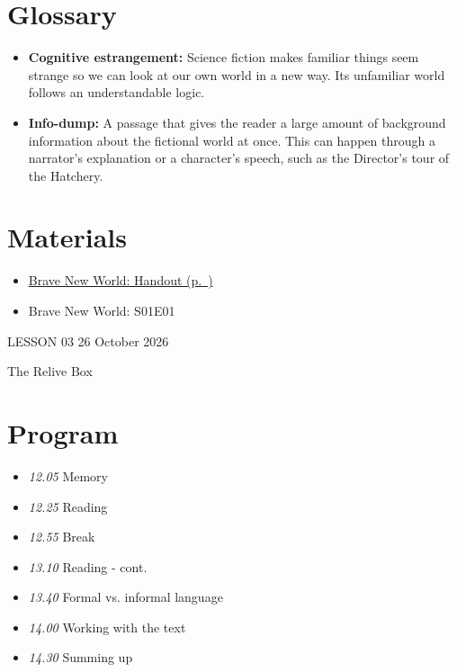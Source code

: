 \documentclass[11pt,a4paper,oneside]{book}
\begin{document}
\section*{Glossary}

\begin{itemize}
\item \textbf{Cognitive estrangement:} Science fiction makes familiar things seem strange so we can look at our own world in a new way. Its unfamiliar world follows an understandable logic.
\item \textbf{Info-dump:} A passage that gives the reader a large amount of background information about the fictional world at once. This can happen through a narrator’s explanation or a character’s speech, such as the Director’s tour of the Hatchery.
\end{itemize}

\section*{Materials}

\begin{itemize}
\item \hyperref[worksheet-16]{Brave New World: Handout (p.~\pageref*{worksheet-16})}
\item Brave New World: S01E01
\end{itemize}

\clearpage{}
{\color{blue}\small LESSON 03 \hfill 26 October 2026\par}
\vspace{4mm}
{\displayfont\color{navy}\fontsize{30}{34}\selectfont The Relive Box\par}\vspace{4mm}

\section*{Program}

\begin{itemize}
\item \emph{12.05} Memory
\item \emph{12.25} Reading
\item \emph{12.55} Break
\item \emph{13.10} Reading - cont.
\item \emph{13.40} Formal vs. informal language
\item \emph{14.00} Working with the text
\item \emph{14.30} Summing up
\end{itemize}
\end{document}

